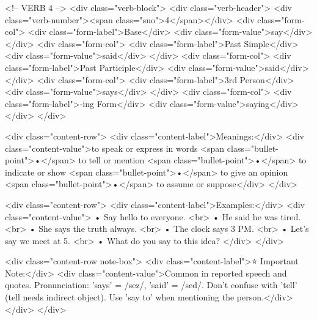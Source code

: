         <!-- VERB 4 -->
        <div class="verb-block">
            <div class="verb-header">
                <div class="verb-number"><span class="sno">4</span></div>
                <div class="form-col">
                    <div class="form-label">Base</div>
                    <div class="form-value">say</div>
                </div>
                <div class="form-col">
                    <div class="form-label">Past Simple</div>
                    <div class="form-value">said</div>
                </div>
                <div class="form-col">
                    <div class="form-label">Past Participle</div>
                    <div class="form-value">said</div>
                </div>
                <div class="form-col">
                    <div class="form-label">3rd Person</div>
                    <div class="form-value">says</div>
                </div>
                <div class="form-col">
                    <div class="form-label">-ing Form</div>
                    <div class="form-value">saying</div>
                </div>
            </div>
            
            <div class="content-row">
                <div class="content-label">Meanings:</div>
                <div class="content-value">to speak or express in words <span class="bullet-point">•</span> to tell or mention <span class="bullet-point">•</span> to indicate or show <span class="bullet-point">•</span> to give an opinion <span class="bullet-point">•</span> to assume or suppose</div>
            </div>
            
            <div class="content-row">
                <div class="content-label">Examples:</div>
                <div class="content-value">
                    • Say hello to everyone. <br>
                    • He said he was tired. <br>
                    • She says the truth always. <br>
                    • The clock says 3 PM. <br>
                    • Let's say we meet at 5. <br>
                    • What do you say to this idea?
                </div>
            </div>
            
            <div class="content-row note-box">
                <div class="content-label">⭐ Important Note:</div>
                <div class="content-value">Common in reported speech and quotes. Pronunciation: 'says' = /sez/, 'said' = /sed/. Don't confuse with 'tell' (tell needs indirect object). Use 'say to' when mentioning the person.</div>
            </div>
        </div>
        
